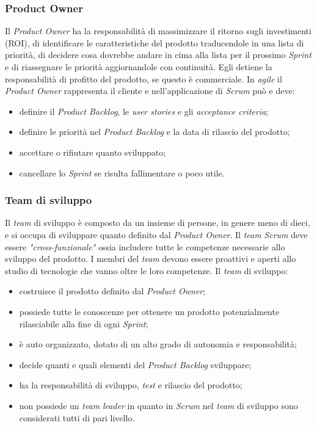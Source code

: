 \subsubsection{Product Owner}
Il \textit{Product Owner} ha la responsabilità di massimizzare il ritorno sugli investimenti (ROI), di identificare le caratteristiche del prodotto traducendole in una lista di priorità, di decidere cosa dovrebbe andare in cima alla lista per il prossimo \textit{Sprint} e di riassegnare le priorità aggiornandole con continuità. Egli detiene la responsabilità di profitto del prodotto, se questo è commerciale. In \textit{agile} il \textit{Product Owner} rappresenta il cliente e nell'applicazione di \textit{Scrum} può e deve:
\begin{itemize}
    \item definire il \textit{Product Backlog}, le \textit{user stories} e gli \textit{acceptance criteria};
    \item definire le priorità nel \textit{Product Backlog} e la data di rilascio del prodotto;
    \item accettare o rifiutare quanto sviluppato;
    \item cancellare lo \textit{Sprint} se risulta fallimentare o poco utile.
\end{itemize}


\subsubsection{Team di sviluppo}
Il \textit{team} di sviluppo è composto da un insieme di persone, in genere meno di dieci, e si occupa di sviluppare quanto definito dal \textit{Product Owner}. Il \textit{team} \textit{Scrum} deve essere \textit{"cross-funzionale"} ossia includere tutte le competenze necessarie allo sviluppo del prodotto. I membri del \textit{team} devono essere proattivi e aperti allo studio di tecnologie che vanno oltre le loro competenze.
Il \textit{team} di sviluppo:
\begin{itemize}
    \item costruisce il prodotto definito dal \textit{Product Owner};
    \item possiede tutte le conoscenze per ottenere un prodotto potenzialmente rilasciabile alla fine di ogni \textit{Sprint};
    \item è auto organizzato, dotato di un alto grado di autonomia e responsabilità;
    \item decide quanti e quali elementi del \textit{Product Backlog} sviluppare;
    \item ha la responsabilità di sviluppo, \textit{test} e rilascio del prodotto;
    \item non possiede un \textit{team} \textit{leader} in quanto in \textit{Scrum} nel \textit{team} di sviluppo sono considerati tutti di pari livello.
\end{itemize}

